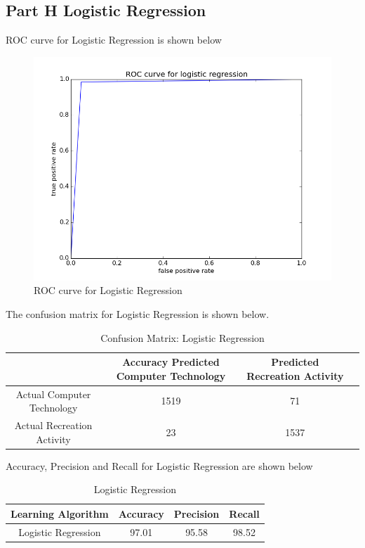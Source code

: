 \documentclass[11pt]{article}
\begin{document}
\newpage
\subsection{Part H Logistic Regression}

ROC curve for Logistic Regression is shown below

\begin{figure}[H]
	\centering
	\includegraphics[scale = 0.6]{ROC_LogisticRegression.png}
	\caption{ROC curve for Logistic Regression}
\end{figure}

The confusion matrix for Logistic Regression is shown below.

\begin{table}[H]
	\centering
	\begin{tabular}{|c|c|c|c|} \hline
		& Accuracy 		Predicted Computer Technology & Predicted Recreation Activity \\ \hline
		Actual Computer Technology & 1519 & 71 \\
		Actual Recreation Activity & 23& 1537  \\
		\hline
	\end{tabular}
	\caption{Confusion Matrix: Logistic Regression}
\end{table}

Accuracy, Precision and Recall for Logistic Regression are shown below

\begin{table}[H]
	\centering
	\begin{tabular}{|c|c|c|c|} \hline
		Learning Algorithm & Accuracy & Precision & Recall\\ \hline
		Logistic Regression& 97.01 & 95.58 & 98.52 \\
		\hline
	\end{tabular}
	\caption{Logistic Regression}
\end{table}
\end{document}
